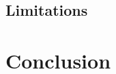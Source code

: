 \documentclass[lettersize,journal]{IEEEtran}
\begin{document}
\subsection{Limitations}
\label{sec:limitations}

\section{Conclusion}
\label{sec:conclusion}



\end{document}
